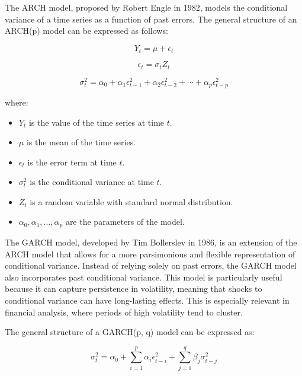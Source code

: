 The ARCH model, proposed by Robert Engle in 1982, models the conditional variance of a time series as a function of past errors. The general structure of an ARCH(p) model can be expressed as follows:

\begin{equation}
Y_t = \mu + \epsilon_t
\end{equation}

\begin{equation}
\epsilon_t = \sigma_t Z_t
\end{equation}

\begin{equation}
\sigma_t^2 = \alpha_0 + \alpha_1 \epsilon_{t-1}^2 + \alpha_2 \epsilon_{t-2}^2 + \cdots + \alpha_p \epsilon_{t-p}^2
\end{equation}

where:
\begin{itemize}
    \item \( Y_t \) is the value of the time series at time \( t \).
    \item \( \mu \) is the mean of the time series.
    \item \( \epsilon_t \) is the error term at time \( t \).
    \item \( \sigma_t^2 \) is the conditional variance at time \( t \).
    \item \( Z_t \) is a random variable with standard normal distribution.
    \item \( \alpha_0, \alpha_1, \ldots, \alpha_p \) are the parameters of the model.
\end{itemize}

The GARCH model, developed by Tim Bollerslev in 1986, is an extension of the ARCH model that allows for a more parsimonious and flexible representation of conditional variance. Instead of relying solely on past errors, the GARCH model also incorporates past conditional variance. This model is particularly useful because it can capture persistence in volatility, meaning that shocks to conditional variance can have long-lasting effects. This is especially relevant in financial analysis, where periods of high volatility tend to cluster.

The general structure of a GARCH(p, q) model can be expressed as:

\begin{equation}
\sigma_t^2 = \alpha_0 + \sum_{i=1}^p \alpha_i \epsilon_{t-i}^2 + \sum_{j=1}^q \beta_j \sigma_{t-j}^2
\end{equation}

